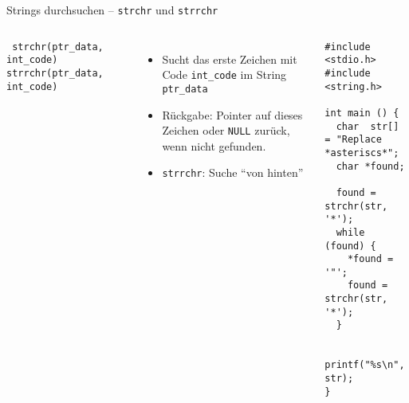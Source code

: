 \begin{frame}[fragile]{Strings durchsuchen -- \texttt{strchr} und \texttt{strrchr}}
%
\begin{columns}[T]
\begin{codebox}[Syntax]
\footnotesize\texttt{ strchr(ptr\_data, int\_code)}\newline
\footnotesize\texttt{strrchr(ptr\_data, int\_code)}
\end{codebox}
%
\begin{itemize}
\item Sucht das erste Zeichen mit Code \texttt{int\_code} im String \texttt{ptr\_data}
\item Rückgabe: Pointer auf dieses Zeichen oder \texttt{NULL} zurück, wenn nicht gefunden.
\item \texttt{strrchr}: Suche \enquote{von hinten}
\end{itemize}
%
\begin{codebox}[Beispiel]
\begin{verbatim}
#include <stdio.h>
#include <string.h>

int main () {
  char  str[] = "Replace *asteriscs*";
  char *found;   
   
  found = strchr(str, '*');
  while (found) {
    *found = '"';
    found = strchr(str, '*');
  }
  
  printf("%s\n", str);
}
\end{verbatim}
\end{codebox}
%
\end{columns}
%
\end{frame}


